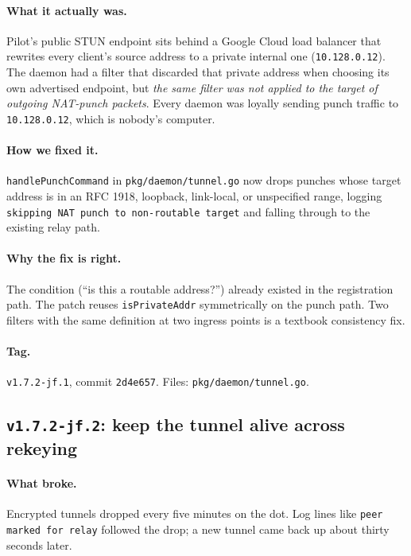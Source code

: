 \documentclass[11pt,a4paper]{article}
\begin{document}
\paragraph{What it actually was.} Pilot's public STUN endpoint
sits behind a Google Cloud load balancer that rewrites every
client's source address to a private internal one
(\texttt{10.128.0.12}). The daemon had a filter that discarded
that private address when choosing its own advertised endpoint,
but \emph{the same filter was not applied to the target of
outgoing NAT-punch packets}. Every daemon was loyally sending
punch traffic to \texttt{10.128.0.12}, which is nobody's
computer.

\paragraph{How we fixed it.} \texttt{handlePunchCommand} in
\texttt{pkg/daemon/tunnel.go} now drops punches whose target
address is in an RFC 1918, loopback, link-local, or unspecified
range, logging \texttt{skipping NAT punch to non-routable target}
and falling through to the existing relay path.

\paragraph{Why the fix is right.} The condition (``is this a
routable address?'') already existed in the registration path.
The patch reuses \texttt{isPrivateAddr} symmetrically on the punch
path. Two filters with the same definition at two ingress points
is a textbook consistency fix.

\paragraph*{Tag.} \texttt{v1.7.2-jf.1}, commit \texttt{2d4e657}.
Files: \texttt{pkg/daemon/tunnel.go}.

\subsection{\texttt{v1.7.2-jf.2}: keep the tunnel alive across
rekeying}

\paragraph{What broke.} Encrypted tunnels dropped every five
minutes on the dot. Log lines like \texttt{peer marked for relay}
followed the drop; a new tunnel came back up about thirty
seconds later.
\end{document}
